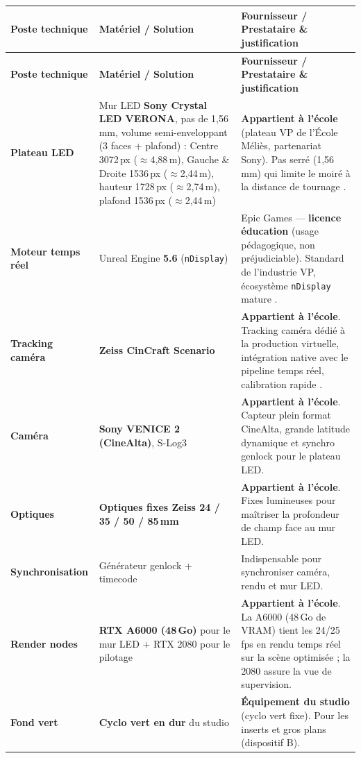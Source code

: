 \documentclass[11pt,a4paper]{report}
\begin{document}
\begin{center}
\small
\begin{longtable}{>{\bfseries}p{3.5cm} p{4.3cm} >{\RaggedRight\arraybackslash}p{6.2cm}}
\rowcolor{brjaune}\textbf{Poste technique} & \textbf{Matériel / Solution} & \textbf{Fournisseur / Prestataire \& justification} \\
\midrule
\endfirsthead
\rowcolor{brjaune}\textbf{Poste technique} & \textbf{Matériel / Solution} & \textbf{Fournisseur / Prestataire \& justification} \\
\midrule
\endhead
Plateau LED & Mur LED \textbf{Sony Crystal LED VERONA}, pas de 1,56\,mm, volume semi-enveloppant (3 faces + plafond) : Centre 3072\,px ($\approx$4,88\,m), Gauche \& Droite 1536\,px ($\approx$2,44\,m), hauteur 1728\,px ($\approx$2,74\,m), plafond 1536\,px ($\approx$2,44\,m) & \textbf{Appartient à l'école} (plateau VP de l'École Méliès, partenariat Sony). Pas serré (1,56\,mm) qui limite le moiré à la distance de tournage \autocite{sony_verona}. \\
Moteur temps réel & Unreal Engine \textbf{5.6} (\texttt{nDisplay}) & Epic Games --- \textbf{licence éducation} (usage pédagogique, non préjudiciable). Standard de l'industrie VP, écosystème \texttt{nDisplay} mature \autocite{epic_ue56}. \\
Tracking caméra & \textbf{Zeiss CinCraft Scenario} & \textbf{Appartient à l'école}. Tracking caméra dédié à la production virtuelle, intégration native avec le pipeline temps réel, calibration rapide \autocite{zeiss_cincraft}. \\
Caméra & \textbf{Sony VENICE 2 (CineAlta)}, S-Log3 & \textbf{Appartient à l'école}. Capteur plein format CineAlta, grande latitude dynamique et synchro genlock pour le plateau LED. \\
Optiques & \textbf{Optiques fixes Zeiss 24 / 35 / 50 / 85\,mm} & \textbf{Appartient à l'école}. Fixes lumineuses pour maîtriser la profondeur de champ face au mur LED. \\
Synchronisation & Générateur genlock + timecode & Indispensable pour synchroniser caméra, rendu et mur LED. \\
Render nodes & \textbf{RTX A6000 (48\,Go)} pour le mur LED + RTX 2080 pour le pilotage & \textbf{Appartient à l'école}. La A6000 (48\,Go de VRAM) tient les 24/25\,fps en rendu temps réel sur la scène optimisée ; la 2080 assure la vue de supervision. \\
Fond vert & \textbf{Cyclo vert en dur} du studio & \textbf{Équipement du studio} (cyclo vert fixe). Pour les inserts et gros plans (dispositif B). \\

\end{longtable}
\end{center}
\end{document}
